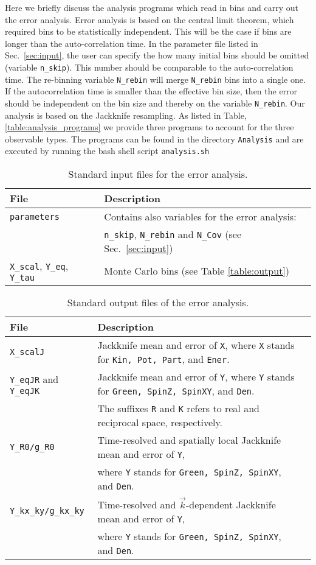 %
Here we briefly discuss the analysis programs which read in bins and carry out the error analysis.  
Error analysis   is based  on the central limit theorem,  which required bins to be statistically independent. This will be the case if bins are  longer than the auto-correlation time.  
In the parameter file listed in Sec.~\ref{sec:input}, the user  can specify the how many initial bins should be omitted (variable \texttt{n\_skip}). 
This  number should be comparable to the auto-correlation time.     
The  re-binning  variable \texttt{N\_rebin} will merge \texttt{N\_rebin}  bins into a single one.  If the autocorrelation time  is smaller than the effective bin size, then the error should be independent on the bin size and thereby on the variable \texttt{N\_rebin}.  Our analysis is based on the Jackknife resampling.  As listed in Table,  \ref{table:analysis_programs}  we provide three programs to account for the three observable types. The programs can be found in the directory \texttt{Analysis}  and   are executed by running the  bash shell script 
\texttt{analysis.sh}
%
\begin{table}[h]
   \begin{tabular}{@{} l l @{}}\toprule
   File & Description \\\midrule
   \texttt{parameters}  &  Contains also variables for the error analysis:\\
   & \texttt{n\_skip}, \texttt{N\_rebin} and \texttt{N\_Cov} (see Sec.~\ref{sec:input}) \\
   \texttt{X\_scal}, \texttt{Y\_eq}, \texttt{Y\_tau} & Monte Carlo bins (see Table \ref{table:output}) \\\bottomrule
    \end{tabular}
   \caption{Standard input files for the error analysis. \label{table:analysis_input}}
\end{table}
%
\begin{table}[h]
   \begin{tabular}{@{} l l l @{}}\toprule
   File & Description \\\midrule
   \texttt{X\_scalJ} & Jackknife mean and error of \texttt{X}, where  \texttt{X} stands for \texttt{Kin, Pot, Part}, and \texttt{Ener}.\\
   \texttt{Y\_eqJR} and \texttt{Y\_eqJK} & Jackknife mean and error of \texttt{Y}, where \texttt{Y} stands for \texttt{Green, SpinZ, SpinXY}, and \texttt{Den}.\\
   & The suffixes \texttt{R} and \texttt{K} refers to real and reciprocal space, respectively.\\
   \texttt{Y\_R0/g\_R0} & Time-resolved and spatially local Jackknife mean and error of \texttt{Y},\\
   & where \texttt{Y} stands for \texttt{Green, SpinZ, SpinXY}, and \texttt{Den}.\\
   \texttt{Y\_kx\_ky/g\_kx\_ky} & Time-resolved and $\vec{k}$-dependent Jackknife mean and error of \texttt{Y},\\
   & where \texttt{Y} stands for \texttt{Green, SpinZ, SpinXY}, and \texttt{Den}.\\\bottomrule
    \end{tabular}
   \caption{ Standard output files of the error analysis. \label{table:analysis_output}}
\end{table}
